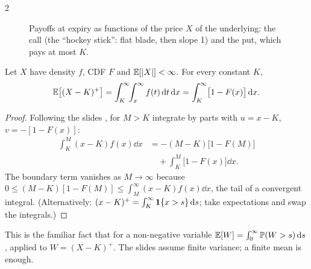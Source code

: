 \begin{paracol}{2}
\begin{figure}[!htb]
\centering
{}\hfill
{}
\caption{Payoffs at expiry as functions of the price $X$ of the underlying: the call (the ``hockey stick'': flat
blade, then slope 1) and the put, which pays at most $K$.}\label{ch03:fig-hockey}
\end{figure}

\begin{theorem}\label{ch03:thm-call}
Let $X$ have density $f$, CDF $F$ and $\mathbb{E}[|X|]<\infty$. For every constant $K$,
\[
  \mathbb{E}\bigl[(X-K)^+\bigr]=\int_K^\infty\!\!\int_x^\infty f(t)\,\mathrm{d} t\,\mathrm{d} x=\int_K^\infty\bigl[1-F(x)\bigr]\,\mathrm{d} x .
\]
\end{theorem}
\begin{proof}
Following the slides , for $M>K$ integrate by parts with $u=x-K$, $v=-[1-F(x)]$:
\begin{align*}
  \int_K^M(x-K)f(x)\dd x&=-(M-K)\bigl[1-F(M)\bigr]\\
  &\quad+\int_K^M\bigl[1-F(x)\bigr]\dd x .
\end{align*}
The boundary term vanishes as $M\to\infty$ because $0\le(M-K)[1-F(M)]\le\int_M^\infty(x-K)f(x)\dd x$, the tail
of a convergent integral. (Alternatively: $(x-K)^+=\int_K^\infty\mathbf{1}\{x>s\}\,\mathrm{d} s$; take expectations and swap
the integrals.)
\end{proof}
This is the familiar fact that for a non-negative variable $\mathbb{E}[W]=\int_0^\infty\mathbb{P}(W>s)\,\mathrm{d} s$
, applied to $W=(X-K)^+$. The slides assume finite variance; a finite mean is enough.


\end{paracol}
